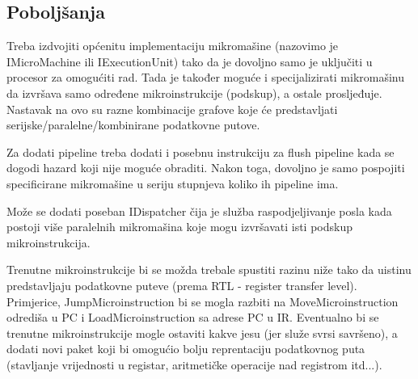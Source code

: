 \documentclass[a4paper]{article}
\begin{document}
  \subsection{Poboljšanja}

  Treba izdvojiti općenitu implementaciju mikromašine (nazovimo je
  IMicroMachine ili IExecutionUnit) tako da je dovoljno samo je
  uključiti u procesor za omogućiti rad. Tada je također moguće i
  specijalizirati mikromašinu da izvršava samo određene
  mikroinstrukcije (podskup), a ostale prosljeđuje. Nastavak na ovo su
  razne kombinacije grafove koje će predstavljati
  serijske/paralelne/kombinirane podatkovne putove.

  Za dodati pipeline treba dodati i posebnu instrukciju za flush
  pipeline kada se dogodi hazard koji nije moguće obraditi. Nakon
  toga, dovoljno je samo pospojiti specificirane mikromašine u seriju
  stupnjeva koliko ih pipeline ima.

  Može se dodati poseban IDispatcher čija je služba raspodjeljivanje posla
  kada postoji više paralelnih mikromašina koje mogu izvršavati isti podskup
  mikroinstrukcija.

  Trenutne mikroinstrukcije bi se možda trebale spustiti razinu niže
  tako da uistinu predstavljaju podatkovne puteve (prema RTL -
  register transfer level). Primjerice, JumpMicroinstruction bi se
  mogla razbiti na MoveMicroinstruction odrediša u PC i
  LoadMicroinstruction sa adrese PC u IR. Eventualno bi se trenutne
  mikroinstrukcije mogle ostaviti kakve jesu (jer služe svrsi
  savršeno), a dodati novi paket koji bi omogućio bolju reprentaciju
  podatkovnog puta (stavljanje vrijednosti u registar, aritmetičke
  operacije nad registrom itd...).
\end{document}
